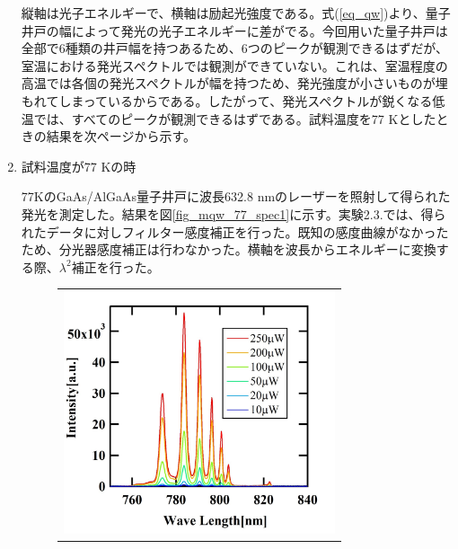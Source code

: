 \documentclass[11pt,a4j]{jsarticle}
\begin{document}
\begin{enumerate}


       \newpage

       縦軸は光子エネルギーで、横軸は励起光強度である。式(\ref{eq_qw})より、量子井戸の幅によって発光の光子エネルギーに差がでる。今回用いた量子井戸は全部で6種類の井戸幅を持つあるため、6つのピークが観測できるはずだが、室温における発光スペクトルでは観測ができていない。これは、室温程度の高温では各個の発光スペクトルが幅を持つため、発光強度が小さいものが埋もれてしまっているからである。したがって、発光スペクトルが鋭くなる低温では、すべてのピークが観測できるはずである。試料温度を77 Kとしたときの結果を次ページから示す。

       \newpage
 \item 試料温度が77 Kの時

       77KのGaAs/AlGaAs量子井戸に波長632.8 nmのレーザーを照射して得られた発光を測定した。結果を図\ref{fig_mqw_77_spec1}に示す。実験2.3.では、得られたデータに対しフィルター感度補正を行った。既知の感度曲線がなかったため、分光器感度補正は行わなかった。横軸を波長からエネルギーに変換する際、$\lambda^2$補正を行った。


       \begin{figure}[ht]
        \centering
        \begin{tabular}{c}

         \begin{minipage}{0.52\hsize}

          \includegraphics[clip,width=8cm]{start2_MQW_77K_Spectrum_wav.jpg}
         \end{minipage}


\end{tabular}
\end{figure}
\end{enumerate}
\end{document}
